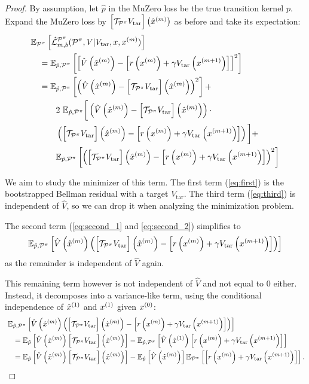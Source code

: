 \begin{proof}

By assumption, let $\hat{p}$ in the MuZero loss be the true transition kernel $p$. Expand the MuZero loss by $\target{m}$ as before and take its expectation:
\begin{align}
    &\EEX{\P^\pi}{\hat{\mathcal{L}}^{\P^\pi}_{m,b}(\P^\pi, V| V_{\mathrm{tar}}, x, x^{(m)})}\\ 
    &\quad = \EEX{\hat{p},\P^\pi}{\squareb{ \hat{V}\roundb{\mx{m}} - \TrV{m}}^2}\\
    &\quad = \EEX{\hat{p},\P^\pi}{ \roundb{\hat{V}\roundb{\mx{m}} - \target{m}}^2}  +\label{eq:first}\\
    &\quad \quad \quad 2~\mathbb{E}_{\hat{p},\P^\pi}\bigg[\roundb{\hat{V}\roundb{\mx{m}} - \target{m}} \cdot \label{eq:second_1}\\
    &\quad \quad \quad \roundb{\target{m} - \TrV{m}}\bigg] + \label{eq:second_2}\\
    &\quad \quad \quad \EEX{\hat{p},\P^\pi}{\roundb{\target{m} - \TrV{m}}^2}\label{eq:third}
\end{align}

We aim to study the minimizer of this term.
The first term (\autoref{eq:first}) is the bootstrapped Bellman residual with a target $V_\mathrm{tar}$.
The third term (\autoref{eq:third}) is independent of $\hat{V}$, so we can drop it when analyzing the minimization problem.

The second term (\autoref{eq:second_1} and \autoref{eq:second_2}) simplifies to
\begin{align}
    \EEX{\hat{p},\P^\pi}{\hat{V}\roundb{\mx{m}}\roundb{\target{m} - \TrV{m}}}
\end{align}
as the remainder is independent of $\hat{V}$ again.

This remaining term however is not independent of $\hat{V}$ and not equal to $0$ either.
Instead, it decomposes into a variance-like term, using the conditional independence of $\mx{1}$ and $\px{1}$ given $\px{0}$:
\begin{align}
    &~\EEX{\hat{p},\P^\pi}{ \hat{V}\roundb{\mx{m}}\roundb{\target{m} - \TrV{m}}}\\
    &\quad =\EEX{\hat{p}}{ \hat{V}\roundb{\mx{m}}\target{m}} - \EEX{\hat{p},\P^\pi}{\hat{V}\roundb{\mx{1}}\TrV{m}}\\
    &\quad =\EEX{\hat{p}}{ \hat{V}\roundb{\mx{m}}\target{m}} - \EEX{\hat{p}}{\hat{V}\roundb{\mx{m}}} \EEX{\P^\pi}{\TrV{m}}.
\end{align}


\end{proof}
